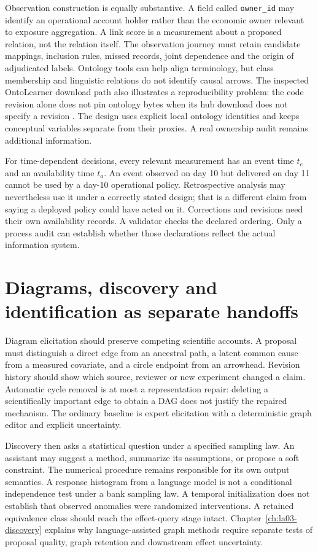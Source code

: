 Observation construction is equally substantive. A field called
\texttt{owner\_id} may identify an operational account holder rather than the
economic owner relevant to exposure aggregation. A link score is a measurement
about a proposed relation, not the relation itself. The observation journey must
retain candidate mappings, inclusion rules, missed records, joint dependence
and the origin of adjudicated labels. Ontology tools can help align terminology,
but class membership and linguistic relations do not identify causal arrows.
The inspected OntoLearner download path also illustrates a reproducibility
problem: the code revision alone does not pin ontology bytes when its hub download
does not specify a revision \citep{v12_la_package_ontolearner}. The design uses
explicit local ontology identities and keeps conceptual variables separate from
their proxies. A real ownership audit remains additional information.

For time-dependent decisions, every relevant measurement has an event time
$t_e$ and an availability time $t_a$. An event observed on day 10 but delivered
on day 11 cannot be used by a day-10 operational policy. Retrospective analysis
may nevertheless use it under a correctly stated design; that is a different
claim from saying a deployed policy could have acted on it. Corrections and
revisions need their own availability records. A validator checks the declared
ordering. Only a process audit can establish whether those declarations reflect
the actual information system.

\section{Diagrams, discovery and identification as separate handoffs}

Diagram elicitation should preserve competing scientific accounts. A proposal
must distinguish a direct edge from an ancestral path, a latent common cause
from a measured covariate, and a circle endpoint from an arrowhead. Revision
history should show which source, reviewer or new experiment changed a claim.
Automatic cycle removal is at most a representation repair: deleting a
scientifically important edge to obtain a DAG does not justify the repaired
mechanism. The ordinary baseline is expert elicitation with a deterministic
graph editor and explicit uncertainty.

Discovery then asks a statistical question under a specified sampling law.
An assistant may suggest a method, summarize its assumptions, or propose a soft
constraint. The numerical procedure remains responsible for its own output
semantics. A response histogram from a language model is not a conditional
independence test under a bank sampling law. A temporal initialization does not
establish that observed anomalies were randomized interventions. A retained
equivalence class should reach the effect-query stage intact. Chapter~\ref{ch:la03-discovery}
explains why language-assisted graph methods require separate tests of
proposal quality, graph retention and downstream effect uncertainty.

